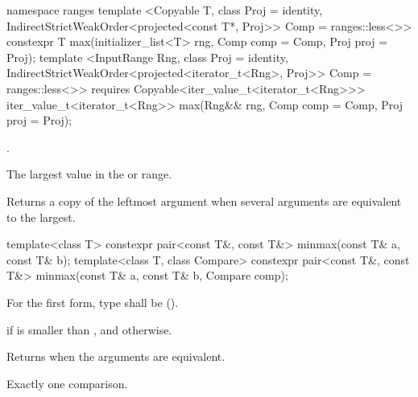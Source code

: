 \begin{addedblock}
%
\begin{itemdecl}
namespace ranges {
  template <Copyable T, class Proj = identity,
            IndirectStrictWeakOrder<projected<const T*, Proj>> Comp = ranges::less<>>
    constexpr T max(initializer_list<T> rng, Comp comp = Comp{}, Proj proj = Proj{});
  template <InputRange Rng, class Proj = identity,
            IndirectStrictWeakOrder<projected<iterator_t<Rng>, Proj>> Comp = ranges::less<>>
      requires Copyable<iter_value_t<iterator_t<Rng>>>
    iter_value_t<iterator_t<Rng>> max(Rng&& rng, Comp comp = Comp{}, Proj proj = Proj{});
}
\end{itemdecl}

\begin{itemdescr}
\pnum
\requires {}.

\pnum
\returns The largest value in the  or range.

\pnum
\remarks Returns a copy of the leftmost argument when several arguments are equivalent to the largest.
\end{itemdescr}
\end{addedblock}

%
\begin{itemdecl}
template<class T> constexpr pair<const T&, const T&> minmax(const T& a, const T& b);
template<class T, class Compare>
  constexpr pair<const T&, const T&> minmax(const T& a, const T& b, Compare comp);
\end{itemdecl}

\begin{itemdescr}
\pnum
\requires
For the first form, type  shall be
 ().

\pnum
\returns
{} if  is smaller
than , and
 otherwise.

\pnum
\remarks
Returns  when the arguments are equivalent.

\pnum
\complexity
Exactly one comparison.
\end{itemdescr}

